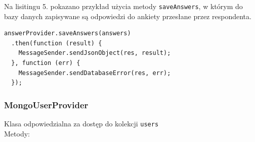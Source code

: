\documentclass[12pt,a4paper,notitlepage]{article}
\begin{document}
\par Na lisitingu 5. pokazano przykład użycia metody \texttt{saveAnswers}, w którym do bazy danych zapisywane są odpowiedzi do ankiety przesłane przez respondenta.

\begin{lstlisting}[caption=Przykład użycia metody \texttt{saveAnswers} ]
answerProvider.saveAnswers(answers)
  .then(function (result) {
    MessageSender.sendJsonObject(res, result);
  }, function (err) {
    MessageSender.sendDatabaseError(res, err);
  });
\end{lstlisting}

\newpage
\subsubsection{MongoUserProvider}
Klasa odpowiedzialna za dostęp do kolekcji \texttt{users} \\ 
Metody:
\end{document}
